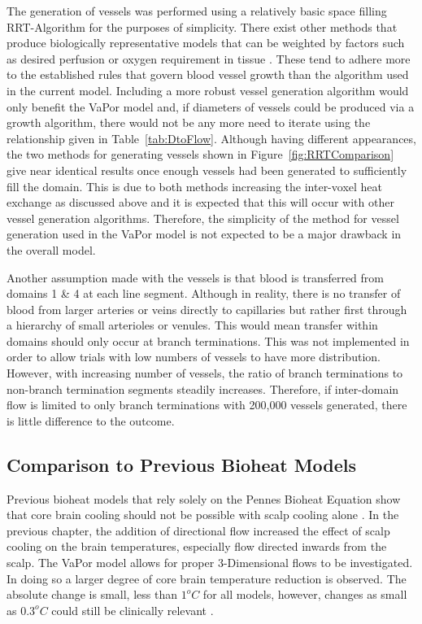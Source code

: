 \documentclass[11pt,english,a4paper,twoside,openright]{report}
\begin{document}
{{{{{{{{The generation of vessels was performed using a relatively basic space filling RRT-Algorithm for the purposes of simplicity. There exist other methods that produce biologically representative models that can be weighted by factors such as desired perfusion or oxygen requirement in tissue \cite{schreiner1993computer}\cite{schneider2012tissue}. These tend to adhere more to the established rules that govern blood vessel growth than the algorithm used in the current model. Including a more robust vessel generation algorithm would only benefit the VaPor model and, if diameters of vessels could be produced via a growth algorithm, there would not be any more need to iterate using the relationship given in Table~\ref{tab:DtoFlow}. Although having different appearances, the two methods for generating vessels shown in Figure~\ref{fig:RRTComparison} give near identical results once enough vessels had been generated to sufficiently fill the domain. This is due to both methods increasing the inter-voxel heat exchange as discussed above and it is expected that this will occur with other vessel generation algorithms. Therefore, the simplicity of the method for vessel generation used in the VaPor model is not expected to be a major drawback in the overall model.

Another assumption made with the vessels is that blood is transferred from domains 1 \& 4 at each line segment. Although in reality, there is no transfer of blood from larger arteries or veins directly to capillaries but rather first through a hierarchy of small arterioles or venules. This would mean transfer within domains should only occur at branch terminations. This was not implemented in order to allow trials with low numbers of vessels to have more distribution. However, with increasing number of vessels, the ratio of branch terminations to non-branch termination segments steadily increases. Therefore, if inter-domain flow is limited to only branch terminations with 200,000 vessels generated, there is little difference to the outcome. 

\subsection{Comparison to Previous Bioheat Models}

Previous bioheat models that rely solely on the Pennes Bioheat Equation show that core brain cooling should not be possible with scalp cooling alone \cite{nelson1998brain}\cite{sukstanskii2004analytical}\cite{zhu2001theoretical}. In the previous chapter, the addition of directional flow increased the effect of scalp cooling on the brain temperatures, especially flow directed inwards from the scalp. The VaPor model allows for proper 3-Dimensional flows to be investigated. In doing so a larger degree of core brain temperature reduction is observed. The absolute change is small, less than $1^{o}C$ for all models, however, changes as small as $0.3^{o}C$ could still be clinically relevant \cite{mariak2002intracranial}. 

}}}}}}}}
\end{document}
